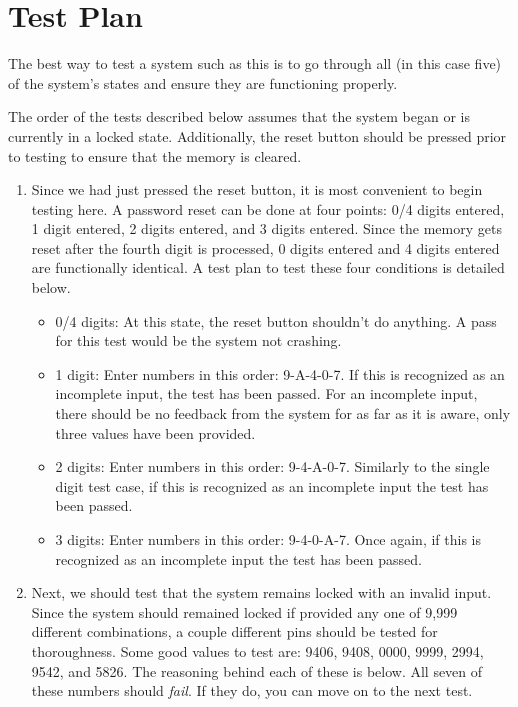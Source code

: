 \documentclass[10pt,a4paper]{article}
\begin{document}
	\section{Test Plan}
	The best way to test a system such as this is to go through all (in this case five) of the system's states and ensure they are functioning properly.
	
	The order of the tests described below assumes that the system began or is currently in a locked state. Additionally, the reset button should be pressed prior to testing to ensure that the memory is cleared. 
	\begin{enumerate}
		\item Since we had just pressed the reset button, it is most convenient to begin testing here. A password reset can be done at four points: 0/4 digits entered, 1 digit entered, 2 digits entered, and 3 digits entered. Since the memory gets reset after the fourth digit is processed, 0 digits entered and 4 digits entered are functionally identical. A test plan to test these four conditions is detailed below.
		\begin{itemize}
			\item 0/4 digits: At this state, the reset button shouldn't do anything. A pass for this test would be the system not crashing. 
			\item 1 digit: Enter numbers in this order: 9-A-4-0-7. If this is recognized as an incomplete input, the test has been passed. For an incomplete input, there should be no feedback from the system for as far as it is aware, only three values have been provided. 
			\item 2 digits: Enter numbers in this order: 9-4-A-0-7. Similarly to the single digit test case, if this is recognized as an incomplete input the test has been passed.
			\item 3 digits: Enter numbers in this order: 9-4-0-A-7. Once again, if this is recognized as an incomplete input the test has been passed.
		\end{itemize}
		\item Next, we should test that the system remains locked with an invalid input. Since the system should remained locked if provided any one of 9,999 different combinations, a couple different pins should be tested for thoroughness. Some good values to test are: 9406, 9408, 0000, 9999, 2994, 9542, and 5826. The reasoning behind each of these is below. All seven of these numbers should \textit{fail}. If they do, you can move on to the next test. 
		\begin{itemize}

\end{itemize}
\end{enumerate}
\end{document}
